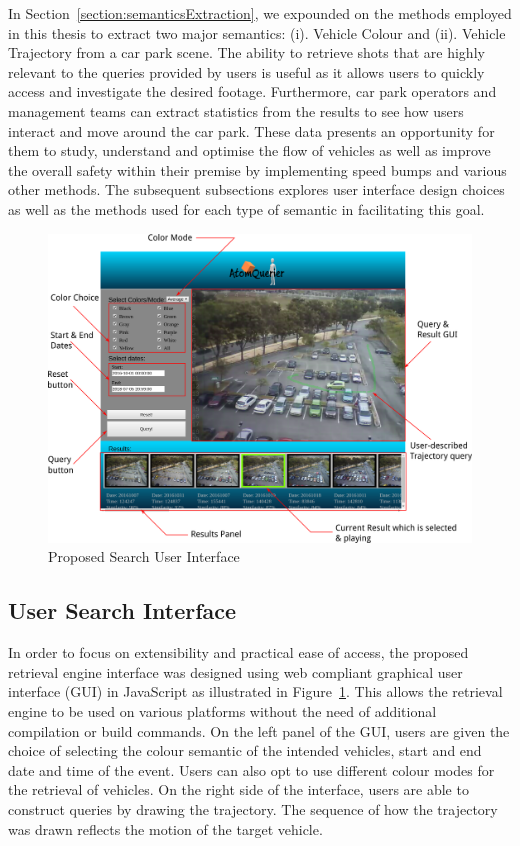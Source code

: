 In Section~\ref{section:semanticsExtraction}, 
we expounded on the methods employed in this thesis to extract two major semantics: 
(i). Vehicle Colour and (ii). Vehicle Trajectory from a car park scene. 
The ability to retrieve shots that are highly relevant to the queries provided by users is useful as it allows users to quickly access and investigate the desired footage. 
Furthermore, car park operators and management teams can extract statistics from the results to see how users interact and move around the car park. 
These data presents an opportunity for them to study, understand and optimise the flow of vehicles as well as improve the overall safety within their premise by implementing speed bumps and various other methods.
The subsequent subsections explores user interface design choices as well as the methods used for each type of semantic in facilitating this goal.

\begin{figure}[thb!]\centering
\includegraphics[width=\textwidth]{image/retrievalTwo/VISERinterface2.png}
\caption{Proposed Search User Interface}
\label{fig:versionTwoInterface}
\end{figure}

\subsection{User Search Interface}
In order to focus on extensibility and practical ease of access, the proposed retrieval engine interface was designed using web compliant graphical user interface (GUI) in JavaScript as illustrated in Figure~\ref{fig:versionTwoInterface}. 
This allows the retrieval engine to be used on various platforms without the need of additional compilation or build commands.
On the left panel of the GUI, users are given the choice of selecting the colour semantic of the intended vehicles, start and end date and time of the event. Users can also opt to use different colour modes for the retrieval of vehicles. 
On the right side of the interface, users are able to construct queries by drawing the trajectory. 
The sequence of how the trajectory was drawn reflects the motion of the target vehicle.

